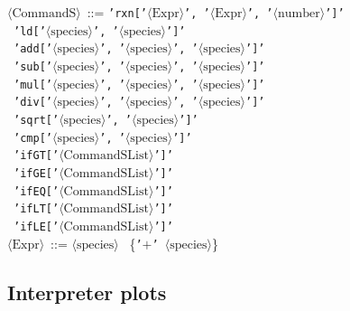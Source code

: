 \begin{tabbing}
    $\langle \text{CommandS} \rangle$ \,::=\;  \texttt{'rxn['$\langle \text{Expr} \rangle$', '$\langle \text{Expr} \rangle$', '$\langle \text{number} \rangle$']'} \\
    \>\textbar \, \texttt{'ld['$\langle \text{species} \rangle$', '$\langle \text{species} \rangle$']'} \\
    \>\textbar \, \texttt{'add['$\langle \text{species} \rangle$', '$\langle \text{species} \rangle$', '$\langle \text{species} \rangle$']'} \\
    \>\textbar \, \texttt{'sub['$\langle \text{species} \rangle$', '$\langle \text{species} \rangle$', '$\langle \text{species} \rangle$']'} \\
    \>\textbar \, \texttt{'mul['$\langle \text{species} \rangle$', '$\langle \text{species} \rangle$', '$\langle \text{species} \rangle$']'} \\
    \>\textbar \, \texttt{'div['$\langle \text{species} \rangle$', '$\langle \text{species} \rangle$', '$\langle \text{species} \rangle$']'} \\
    \>\textbar \, \texttt{'sqrt['$\langle \text{species} \rangle$', '$\langle \text{species} \rangle$']'} \\
    \>\textbar \, \texttt{'cmp['$\langle \text{species} \rangle$', '$\langle \text{species} \rangle$']'} \\
    \>\textbar \, \texttt{'ifGT['$\langle \text{CommandSList} \rangle$']'} \\
    \>\textbar \, \texttt{'ifGE['$\langle \text{CommandSList} \rangle$']'} \\
    \>\textbar \, \texttt{'ifEQ['$\langle \text{CommandSList} \rangle$']'} \\
    \>\textbar \, \texttt{'ifLT['$\langle \text{CommandSList} \rangle$']'} \\
    \>\textbar \, \texttt{'ifLE['$\langle \text{CommandSList} \rangle$']'} \\
     
    $\langle \text{Expr} \rangle$ \,::=\;  \texttt{$\langle \text{species} \rangle$} \, \{\texttt{'$+$' $\langle \text{species} \rangle$}\}
\end{tabbing}


\subsection{Interpreter plots}\label{sec:interpreter_plots}

